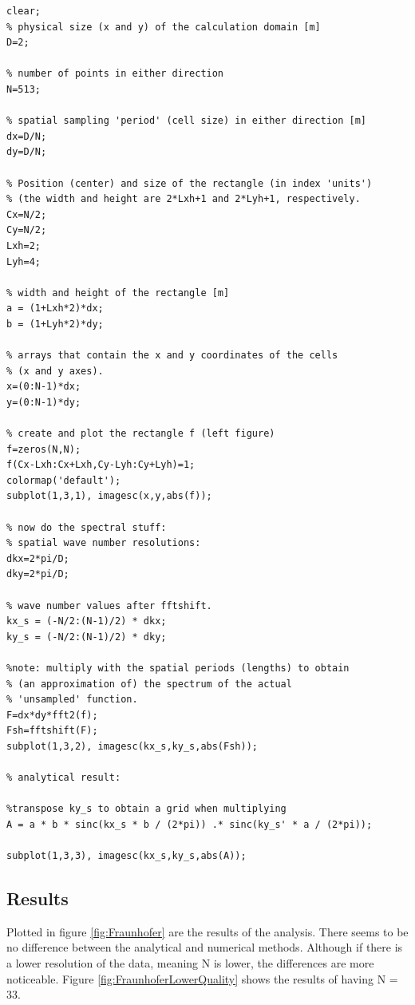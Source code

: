 \begin{lstlisting}[caption={MATLAB script dft_rect.m},
label={lst:fraunhofer}]
clear;
% physical size (x and y) of the calculation domain [m]
D=2;

% number of points in either direction
N=513;

% spatial sampling 'period' (cell size) in either direction [m]
dx=D/N;
dy=D/N;

% Position (center) and size of the rectangle (in index 'units')
% (the width and height are 2*Lxh+1 and 2*Lyh+1, respectively.
Cx=N/2;
Cy=N/2;
Lxh=2;
Lyh=4;

% width and height of the rectangle [m]
a = (1+Lxh*2)*dx;
b = (1+Lyh*2)*dy;

% arrays that contain the x and y coordinates of the cells
% (x and y axes).
x=(0:N-1)*dx;
y=(0:N-1)*dy;

% create and plot the rectangle f (left figure)
f=zeros(N,N);
f(Cx-Lxh:Cx+Lxh,Cy-Lyh:Cy+Lyh)=1;
colormap('default');
subplot(1,3,1), imagesc(x,y,abs(f));

% now do the spectral stuff:
% spatial wave number resolutions:
dkx=2*pi/D;
dky=2*pi/D;

% wave number values after fftshift.
kx_s = (-N/2:(N-1)/2) * dkx;
ky_s = (-N/2:(N-1)/2) * dky;

%note: multiply with the spatial periods (lengths) to obtain
% (an approximation of) the spectrum of the actual
% 'unsampled' function.
F=dx*dy*fft2(f);
Fsh=fftshift(F);
subplot(1,3,2), imagesc(kx_s,ky_s,abs(Fsh));

% analytical result:

%transpose ky_s to obtain a grid when multiplying
A = a * b * sinc(kx_s * b / (2*pi)) .* sinc(ky_s' * a / (2*pi));

subplot(1,3,3), imagesc(kx_s,ky_s,abs(A));

\end{lstlisting}

\subsection{Results}

Plotted in figure \ref{fig:Fraunhofer} are the results of the analysis. There seems to be no difference between the analytical and numerical methods. Although if there is a lower resolution of the data, meaning N is lower, the differences are more noticeable. Figure \ref{fig:FraunhoferLowerQuality} shows the results of having N = 33.  

